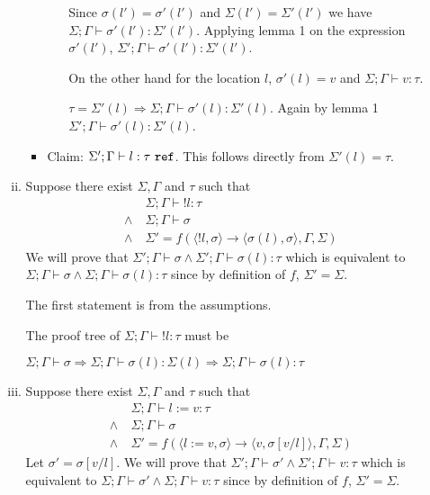 \begin{enumerate}[(a)]
\begin{enumerate}[i.]
\begin{itemize}
\begin{itemize}
    Since $\sigma(l') = \sigma'(l')$ and $\Sigma(l') = \Sigma'(l')$ we have $\Sigma; \Gamma \vdash \sigma'(l') : \Sigma'(l')$. Applying lemma 1 on the expression $\sigma'(l')$, $\Sigma'; \Gamma \vdash \sigma'(l') : \Sigma'(l')$.

    On the other hand for the location $l$, $\sigma'(l) = v$ and $\Sigma;\Gamma \vdash v : \tau$.

    $\tau = \Sigma'(l) \Rightarrow \Sigma;\Gamma \vdash \sigma'(l) : \Sigma'(l)$. Again by lemma 1 $\Sigma';\Gamma \vdash \sigma'(l) : \Sigma'(l)$.
    \end{itemize}
    \item Claim: $\Sigma';\Gamma \vdash l : \tau ~\texttt{ref}$. This follows directly from $\Sigma'(l) = \tau$.
  \end{itemize}
\item {}

  Suppose there exist $\Sigma, \Gamma$ and $\tau$ such that 
  \begin{align*}
  &\Sigma;\Gamma \vdash !l : \tau \\
  \wedge~&\Sigma;\Gamma \vdash \sigma\\
  \wedge~&\Sigma' = f(\langle !l, \sigma \rangle \rightarrow \langle \sigma(l), \sigma \rangle, \Gamma, \Sigma)
  \end{align*}
  We will prove that $\Sigma';\Gamma \vdash \sigma \wedge \Sigma';\Gamma \vdash \sigma(l) : \tau$ which is equivalent to $\Sigma;\Gamma \vdash \sigma \wedge \Sigma;\Gamma \vdash \sigma(l) : \tau$ since by definition of $f$, $\Sigma' = \Sigma$.

  The first statement is from the assumptions.

  The proof tree of $\Sigma;\Gamma \vdash !l : \tau$ must be


  $\Sigma; \Gamma \vdash \sigma \Rightarrow \Sigma;\Gamma \vdash \sigma(l) : \Sigma(l) \Rightarrow \Sigma;\Gamma \vdash \sigma(l) : \tau$

\item {}

  Suppose there exist $\Sigma, \Gamma$ and $\tau$ such that 
  \begin{align*}
  &\Sigma;\Gamma \vdash l := v : \tau \\
  \wedge~&\Sigma;\Gamma \vdash \sigma\\
  \wedge~&\Sigma' = f(\langle l := v, \sigma \rangle \rightarrow \langle v, \sigma[v/l] \rangle, \Gamma, \Sigma)
  \end{align*}
  Let $\sigma' = \sigma[v/l]$. We will prove that $\Sigma';\Gamma \vdash \sigma' \wedge \Sigma';\Gamma \vdash v : \tau$ which is equivalent to $\Sigma;\Gamma \vdash \sigma' \wedge \Sigma;\Gamma \vdash v : \tau$ since by definition of $f$, $\Sigma' = \Sigma$.


\end{enumerate}
\end{enumerate}
